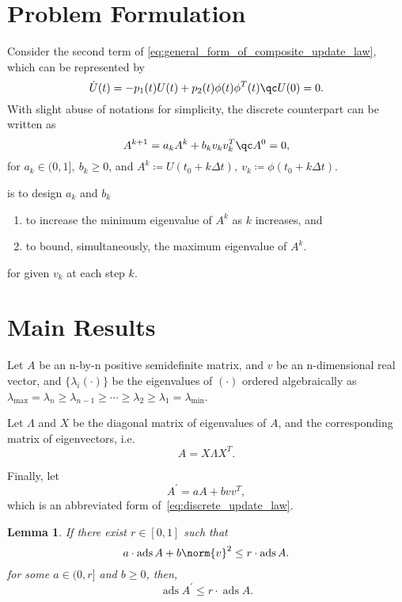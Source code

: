 \documentclass[nobib]{my-handout}
\newtheorem{lemma}{Lemma}
\theoremstyle{definition}
\theoremstyle{remark}
\DeclareMathOperator{\ads}{ads}
\begin{document}
\section{Problem Formulation}

Consider the second term of \eqref{eq:general_form_of_composite_update_law},
which can be represented by
\begin{equation*}
	\dot{U}(t) = - p_1(t) U(t) + p_2(t) \phi(t) \phi^T(t) \qc U(0) = 0.
\end{equation*}
With slight abuse of notations for simplicity, the discrete counterpart can be
written as
\begin{equation}\label{eq:discrete_update_law}
	A^{k+1} = a_k A^k + b_k v_k v_k^T \qc A^0 = 0,
\end{equation}
for $a_k \in (0, 1],\ b_k \ge 0$, and $A^k \coloneqq U(t_0 + k \Delta t),\ v_k
\coloneqq \phi(t_0 + k \Delta t)$.

 is to design $a_k$ and $b_k$
\begin{enumerate}
	\item to increase the minimum eigenvalue of $A^k$ as $k$ increases, and
	\item to bound, simultaneously, the maximum eigenvalue of $A^k$.
\end{enumerate}
for given $v_k$ at each step $k$.


\section{Main Results}

Let $A$ be an n-by-n positive semidefinite matrix, and $v$ be an
n-dimensional real vector, and $\{\lambda_i(\cdot)\}$ be the eigenvalues
of $(\cdot)$ ordered algebraically as $\lambda_{\max} = \lambda_n \ge
\lambda_{n-1} \ge \cdots \ge \lambda_2 \ge \lambda_1 = \lambda_{\min}$.

Let $\Lambda$ and $X$ be the diagonal matrix of eigenvalues of $A$, and the
corresponding matrix of eigenvectors, i.e.
\begin{equation*}
	A = X \Lambda X^T.
\end{equation*}

Finally, let
\begin{equation*}
	A^\prime = a A + b v v^T,
\end{equation*}
which is an abbreviated form of~\eqref{eq:discrete_update_law}.

\begin{lemma}\label{lem:shrinking_ads}
	If there exist $r \in [0, 1]$ such that
	\begin{equation}\label{eq:condition_for_ads}
		a \cdot \ads{A} + b \norm{v}^2 \le r \cdot \ads{A}.
	\end{equation}
	for some $a \in (0, r]$ and $b \ge 0$, then,
	\begin{equation*}
		\ads{A^\prime} \le r \cdot \ads{A}.
	\end{equation*}
\end{lemma}
\end{document}
